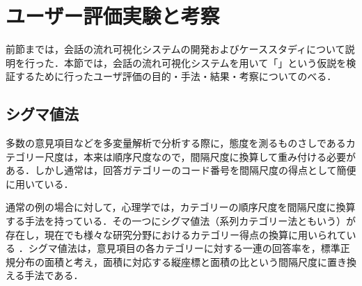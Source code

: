 \documentclass[shuuron]{kuee}
\begin{document}






%
%

\section{ユーザー評価実験と考察}

前節までは，会話の流れ可視化システムの開発およびケーススタディについて説明を行った．本節では，会話の流れ可視化システムを用いて「」という仮説を検証するために行ったユーザ評価の目的・手法・結果・考察についてのべる．%
%
%
%
%
%
%

\subsection{シグマ値法}
多数の意見項目などを多変量解析で分析する際に，態度を測るものさしであるカテゴリー尺度は，本来は順序尺度なので，間隔尺度に換算して重み付ける必要がある．しかし通常は，回答ガテゴリーのコード番号を間隔尺度の得点として簡便に用いている．

通常の例の場合に対して，心理学では，カテゴリーの順序尺度を間隔尺度に換算する手法を持っている．その一つにシグマ値法（系列カテゴリー法ともいう）が存在し\cite{likert1932technique}，現在でも様々な研究分野におけるカテゴリー得点の換算に用いられている\cite{シグマ値法使ってる} \cite{岩本隆2016人事}．シグマ値法は，意見項目の各カテゴリーに対する一連の回答率を，標準正規分布の面積と考え，面積に対応する縦座標と面積の比という間隔尺度に置き換える手法である．
\end{document}
